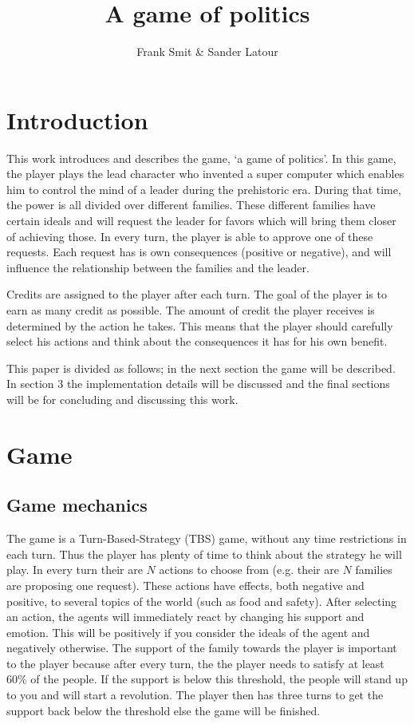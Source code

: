 \documentclass[11pt,a4paper]{article}
\author{Frank Smit \& Sander Latour}
\title{A game of politics}
\begin{document}
\maketitle

\section{Introduction}
This work introduces and describes the game, `a game of politics'. In this game, the player plays the lead character who invented a super computer which enables him to control the mind of a leader during the prehistoric era. During that time, the power is all divided over different families. These different families have certain ideals and will request the leader for favors which will bring them closer of achieving those. In every turn, the player is able to approve one of these requests. Each request has is own consequences (positive or negative), and will influence the relationship between the families and the leader. 

Credits are assigned to the player after each turn. The goal of the player is to earn as many credit as possible. The amount of credit the player receives is determined by the action he takes. This means that the player should carefully select his actions and think about the consequences it has for his own benefit. 

This paper is divided as follows; in the next section the game will be described. In section 3 the implementation details will be discussed and the final sections will be for concluding and discussing this work.

\section{Game}
\subsection{Game mechanics}
The game is a Turn-Based-Strategy (TBS) game, without any time restrictions in each turn. Thus the player has plenty of time to think about the strategy he will play. In every turn their are $N$ actions to choose from (e.g. their are $N$ families are proposing one request). These actions have effects, both negative and positive, to several topics of the world (such as food and safety).  After selecting an action, the agents will immediately react by changing his support and emotion. This will be positively if you consider the ideals of the agent and negatively otherwise. The support of the family towards the player is important to the player because after every turn, the the player needs to satisfy at least 60\% of the people. If the support is below this threshold, the people will stand up to you and will start a revolution. The player then has three turns to get the support back below the threshold else the game will be finished. 
\end{document}
